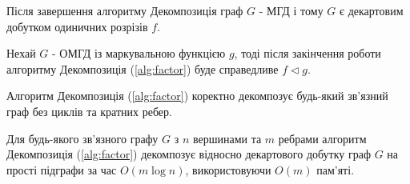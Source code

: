\begin{lemma}
  Після завершення алгоритму Декомпозиція граф $G$ - МГД і тому $G$ є декартовим добутком одиничних розрізів $f$.
\end{lemma}

\begin{lemma}
  Нехай $G$ - ОМГД із маркувальною функцією $g$, тоді  після закінчення роботи алгоритму Декомпозиція (\ref{alg:factor}) буде справедливе $f \triangleleft g$.
\end{lemma}

\begin{theorem}
  Алгоритм Декомпозиція (\ref{alg:factor}) коректно декомпозує будь-який зв'язний граф без циклів та кратних ребер.
\end{theorem}

\begin{theorem}
  Для будь-якого зв'язного графу $G$ з $n$ вершинами та $m$ ребрами алгоритм Декомпозиція (\ref{alg:factor}) декомпозує відносно декартового добутку граф $G$ на прості підграфи за час $O(m \log n)$, використовуючи $O(m)$ пам'яті.
\end{theorem}
